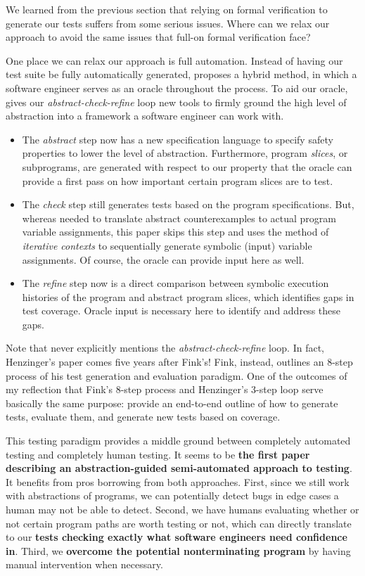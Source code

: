\documentclass[acmsmall,review, nonacm]{acmart}
\begin{document}
We learned from the previous section that relying on formal verification to generate our tests suffers from some serious issues. Where can we relax our approach to avoid the same issues that full-on formal verification face?

One place we can relax our approach is full automation. Instead of having our test suite be fully automatically generated, \cite{fink1997property} proposes a hybrid method, in which a software engineer serves as an oracle throughout the process. To aid our oracle, \cite{fink1997property} gives our \textit{abstract-check-refine} loop new tools to firmly ground the high level of abstraction into a framework a software engineer can work with.

\begin{itemize}
  \item The \textit{abstract} step now has a new specification language to specify safety properties to lower the level of abstraction. Furthermore, program \textit{slices}, or subprograms, are generated with respect to our property that the oracle can provide a first pass on how important certain program slices are to test.
  \item The \textit{check} step still generates tests based on the program specifications. But, whereas \cite{beyer2004generating} needed to translate abstract counterexamples to actual program variable assignments, this paper skips this step and uses the method of \textit{iterative contexts} to sequentially generate symbolic (input) variable assignments. Of course, the oracle can provide input here as well.
  \item The \textit{refine} step now is a direct comparison between symbolic execution histories of the program and abstract program slices, which identifies gaps in test coverage. Oracle input is necessary here to identify and address these gaps.
\end{itemize}

Note that \cite{fink1997property} never explicitly mentions the \textit{abstract-check-refine} loop. In fact, Henzinger's paper comes five years after Fink's! Fink, instead, outlines an 8-step process of his test generation and evaluation paradigm. One of the outcomes of my reflection that Fink's 8-step process and Henzinger's 3-step loop serve basically the same purpose: provide an end-to-end outline of how to generate tests, evaluate them, and generate new tests based on coverage.

This testing paradigm provides a middle ground between completely automated testing and completely human testing. It seems to be \textbf{the first paper describing an abstraction-guided semi-automated approach to testing}. It benefits from pros borrowing from both approaches. First, since we still work with abstractions of programs, we can potentially detect bugs in edge cases a human may not be able to detect. Second, we have humans evaluating whether or not certain program paths are worth testing or not, which can directly translate to our \textbf{tests checking exactly what software engineers need confidence in}. Third, we \textbf{overcome the potential nonterminating program} by having manual intervention when necessary. 
\end{document}
